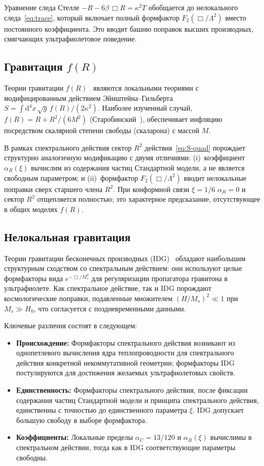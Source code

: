 \documentclass[12pt,a4paper]{article}
\newcommand{\dd}{\mathrm{d}}
\newcommand{\Lam}{\Lambda}
\theoremstyle{plain}
\theoremstyle{definition}
\begin{document}
Уравнение следа Стелле $-R - 6\beta\,\Box R = \kappa^2 T$ обобщается
до нелокального следа~\eqref{eq:trace}, который включает полный
формфактор $F_2(\Box/\Lam^2)$ вместо постоянного коэффициента.  Это
вводит башню поправок высших производных, смягчающих ультрафиолетовое
поведение.

\subsection{Гравитация \texorpdfstring{$f(R)$}{f(R)}}

Теории гравитации $f(R)$~\cite{Sotiriou:2008rp,DeFelice:2010aj}
являются локальными теориями с модифицированным действием
Эйнштейна--Гильберта
$S = \int \dd^4x\,\sqrt{g}\,f(R)/(2\kappa^2)$.  Наиболее изученный
случай, $f(R) = R + R^2/(6M^2)$
(Старобинский~\cite{Starobinsky:1980te}), обеспечивает инфляцию
посредством скалярной степени свободы (скаларона) с массой $M$.

В рамках спектрального действия сектор $R^2$ действия~\eqref{eq:S-quad} порождает
структурно аналогичную модификацию с двумя отличиями:
(i)~коэффициент $\alpha_R(\xi)$ вычислим из содержания частиц
Стандартной модели, а не является свободным параметром; и
(ii)~формфактор $F_2(\Box/\Lam^2)$ вводит нелокальные поправки сверх
старшего члена $R^2$.  При конформной связи $\xi = 1/6$
$\alpha_R = 0$ и сектор $R^2$ отщепляется полностью; это характерное
предсказание, отсутствующее в общих моделях $f(R)$.

\subsection{Нелокальная гравитация}

Теории гравитации бесконечных производных
(IDG)~\cite{Biswas:2005qr,Modesto:2011kw,Biswas:2011ar} обладают
наибольшим структурным сходством со спектральным действием: они используют целые формфакторы
вида $e^{-\Box/M_s^2}$ для регуляризации пропагатора гравитона в
ультрафиолете.  Как спектральное действие, так и IDG порождают космологические поправки,
подавленные множителем $(H/M_s)^2 \ll 1$ при $M_s \gg H_0$, что
согласуется с поздневременными данными.

Ключевые различия состоят в следующем:
\begin{itemize}[nosep]
  \item \textbf{Происхождение:}  Формфакторы спектрального действия возникают из
    однопетлевого вычисления ядра теплопроводности для спектрального
    действия конкретной некоммутативной геометрии; формфакторы IDG
    постулируются для достижения желаемых ультрафиолетовых свойств.
  \item \textbf{Единственность:}  Формфакторы спектрального действия, после фиксации
    содержания частиц Стандартной модели и принципа спектрального
    действия, единственны с точностью до единственного параметра $\xi$.
    IDG допускает большую свободу в выборе формфактора.
  \item \textbf{Коэффициенты:}  Локальные пределы $\alpha_C = 13/120$ и
    $\alpha_R(\xi)$ вычислимы в спектральном действии, тогда как в IDG соответствующие
    параметры свободны.
\end{itemize}
\end{document}
